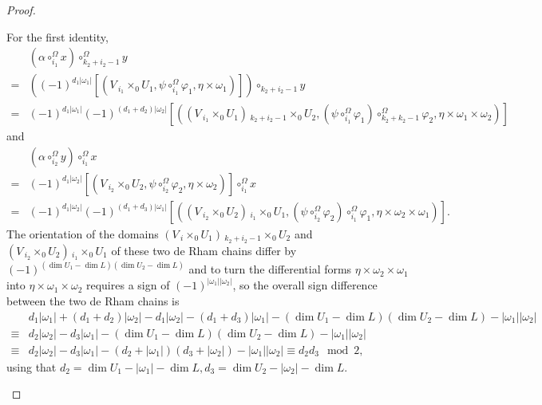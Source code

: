 \documentclass[10pt]{amsart}
\numberwithin{equation}{section}
\theoremstyle{plain}
\theoremstyle{definition}
\theoremstyle{remark}
\numberwithin{equation}{section}
\newcommand{\fiberprod}[2]{\,_{#1}\!\!\times_{#2} }
\begin{document}
{\begin{proof}
\begin{enumerate}
		For the first identity, 
		\begin{align*}
			&(\alpha\circ_{i_1}^\Omega x)\circ^\Omega_{k_2+i_2-1} y\\
			=& \left( (-1)^{d_1 |\omega_1|} [(V\fiberprod{i_1}{0} U_1, \psi \circ_{i_1}^\Omega \varphi_1 , \eta\times \omega_1)] \right) \circ_{k_2+i_2-1} y\\
			=& (-1)^{d_1|\omega_1|}(-1)^{(d_1+d_2) |\omega_2|}[((V\fiberprod{i_1}{0} U_1)\fiberprod{k_2+i_2-1}{0} U_2, (\psi\circ_{i_1}^\Omega \varphi_1)\circ_{k_2+k_2-1}^\Omega \varphi_2 , \eta\times \omega_1\times \omega_2)]
		\end{align*}
		and 
		\begin{align*}
			& (\alpha\circ_{i_2}^\Omega y)\circ^\Omega_{i_1} x\\
			=& (-1)^{d_1|\omega_2|}[( V\fiberprod{i_2}{0}U_2, \psi \circ_{i_2}^\Omega \varphi_2, \eta \times \omega_2 )]\circ_{i_1}^\Omega x\\
			=& (-1)^{d_1|\omega_2|}(-1)^{(d_1+d_3)|\omega_1|}[ ((V\fiberprod{i_2}{0} U_2)\fiberprod{i_1}{0}U_1, (\psi\circ_{i_2}^\Omega \varphi_2)\circ_{i_1}^\Omega \varphi_1, \eta\times \omega_2\times \omega_1) ].
		\end{align*}
		The orientation of the domains $(V\fiberprod{i}{0} U_1)\fiberprod{k_2+i_2-1}{0} U_2$ and $(V\fiberprod{i_2}{0} U_2)\fiberprod{i_1}{0}U_1$ of these two de Rham chains differ by $(-1)^{(\dim U_1 -\dim L) (\dim U_2 - \dim L)}$ and to turn the differential forms $\eta\times \omega_2\times \omega_1$ into $\eta\times \omega_1\times \omega_2$ requires a sign of $(-1)^{|\omega_1||\omega_2|}$, so the overall sign difference between the two de Rham chains is \begin{align*} &d_1|\omega_1|+(d_1+d_2)|\omega_2| - d_1 |\omega_2|-(d_1+d_3)|\omega_1|- (\dim U_1-\dim L)(\dim U_2 - \dim L) -|\omega_1||\omega_2| \\
		\equiv& d_2|\omega_2|  -d_3|\omega_1| -(\dim U_1-\dim L)(\dim U_2-\dim L) - |\omega_1||\omega_2|\\\equiv& d_2|\omega_2|-d_3|\omega_1| -(d_2+|\omega_1|)(d_3+|\omega_2|)-|\omega_1||\omega_2| \equiv d_2d_3\mod 2,
		\end{align*}using that $d_2=\dim U_1 -|\omega_1|-\dim L, d_3=\dim U_2-|\omega_2|-\dim L$.
		

\end{enumerate}
\end{proof}}
\end{document}
